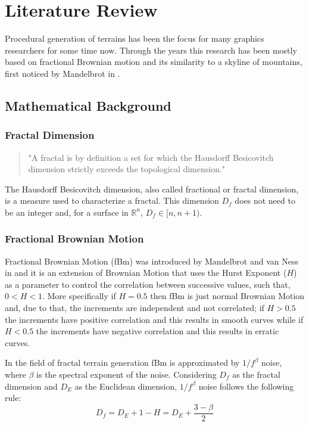 \chapter{Literature Review} \label{chap:literature_review}

Procedural generation of terrains has been the focus for many graphics researchers for some time now. Through the years this research has been mostly based on fractional Brownian motion and its similarity to a skyline of mountains, first noticed by Mandelbrot in \cite{Mandelbrot1983}. 

\section {Mathematical Background}

\subsection{Fractal Dimension}

\begin{quotation}
	"A fractal is by definition a set for which the Hausdorff Besicovitch dimension strictly exceeds the topological dimension." \cite[p.15]{Mandelbrot1983}
\end{quotation}

The Hausdorff Besicovitch dimension, also called fractional or fractal dimension, is a measure used to characterize a fractal. This dimension $ D_f $ does not need to be an integer and, for a surface in $ \mathbb{R}^n $, $ D_f \in [n, n+1)$.

\subsection{Fractional Brownian Motion}

Fractional Brownian Motion (fBm) was introduced by Mandelbrot and van Ness in \cite{Mandelbrot1968} and it is an extension of Brownian Motion that uses the Hurst Exponent ($H$) as a parameter to control the correlation between successive values, such that, $ 0 < H < 1 $. More specifically if $H = 0.5$ then fBm is just normal Brownian Motion and, due to that, the increments are independent and not correlated; if $H > 0.5$ the increments have positive correlation and this results in smooth curves while if $H < 0.5$ the increments have negative correlation and this results in erratic curves. \cite{Musgrave1993}

In the field of fractal terrain generation fBm is approximated by $1/f^\beta$ noise, where $\beta$ is the spectral exponent of the noise. Considering $D_f$ as the fractal dimension and $D_E$ as the Euclidean dimension, $1/f^\beta$ noise follows the following rule:
\[
D_f = D_E + 1 - H = D_E + \frac{3-\beta}{2}
\]

